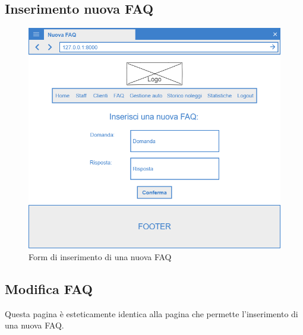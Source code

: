 \documentclass[12pt,a4paperS]{report}
\begin{document}
\begin{normalsize}
			\subsection{Inserimento nuova FAQ}
				\begin{figure}[H]
					\centering
					\includegraphics[width=1\textwidth, height=1\textheight, keepaspectratio]{Mockup/Nuova_faq.png}
					\caption{Form di inserimento di una nuova FAQ}
				\end{figure}
			
			\subsection{Modifica FAQ}
				Questa pagina è esteticamente identica alla pagina che permette l'inserimento di una nuova FAQ.
			
			\newpage

\end{normalsize}
\end{document}
